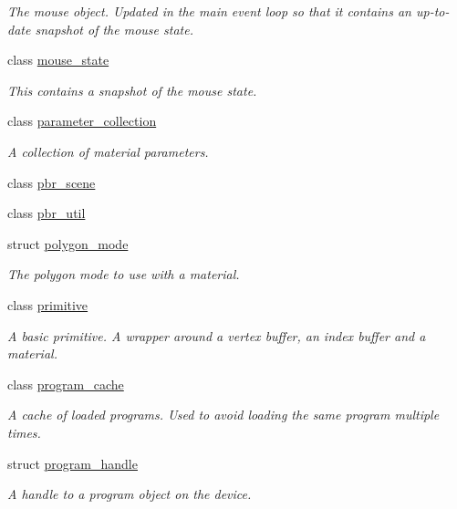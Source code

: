 \begin{DoxyCompactItemize}
\begin{DoxyCompactList}\small\item\em The mouse object. Updated in the main event loop so that it contains an up-\/to-\/date snapshot of the mouse state. \end{DoxyCompactList}\item 
class \mbox{\hyperlink{classmoka_1_1mouse__state}{mouse\+\_\+state}}
\begin{DoxyCompactList}\small\item\em This contains a snapshot of the mouse state. \end{DoxyCompactList}\item 
class \mbox{\hyperlink{classmoka_1_1parameter__collection}{parameter\+\_\+collection}}
\begin{DoxyCompactList}\small\item\em A collection of material parameters. \end{DoxyCompactList}\item 
class \mbox{\hyperlink{classmoka_1_1pbr__scene}{pbr\+\_\+scene}}
\item 
class \mbox{\hyperlink{classmoka_1_1pbr__util}{pbr\+\_\+util}}
\item 
struct \mbox{\hyperlink{structmoka_1_1polygon__mode}{polygon\+\_\+mode}}
\begin{DoxyCompactList}\small\item\em The polygon mode to use with a material. \end{DoxyCompactList}\item 
class \mbox{\hyperlink{classmoka_1_1primitive}{primitive}}
\begin{DoxyCompactList}\small\item\em A basic primitive. A wrapper around a vertex buffer, an index buffer and a material. \end{DoxyCompactList}\item 
class \mbox{\hyperlink{classmoka_1_1program__cache}{program\+\_\+cache}}
\begin{DoxyCompactList}\small\item\em A cache of loaded programs. Used to avoid loading the same program multiple times. \end{DoxyCompactList}\item 
struct \mbox{\hyperlink{structmoka_1_1program__handle}{program\+\_\+handle}}
\begin{DoxyCompactList}\small\item\em A handle to a program object on the device. \end{DoxyCompactList}\item 

\end{DoxyCompactItemize}
